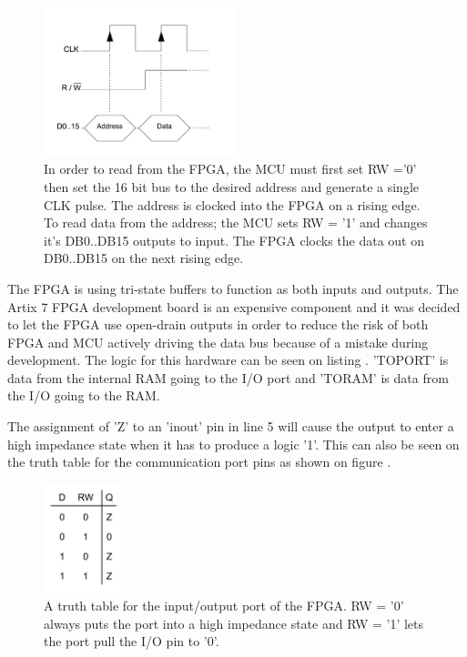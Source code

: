 \begin{figure}[H]
    \centering
    \includegraphics[clip, trim=0 50 0 0, width=0.5\textwidth]{Sections/7_SystemDesign/Figures/7_2_1_CommRead.pdf}
    \caption{In order to read from the FPGA, the MCU must first set RW ='0' then set the 16 bit bus to the desired address and generate a single CLK pulse. The address is clocked into the FPGA on a rising edge. To read data from the address; the MCU sets RW = '1' and changes it's DB0..DB15 outputs to input. The FPGA clocks the data out on DB0..DB15 on the next rising edge.}
    \label{fig_7_2_1_CommRead}
\end{figure}

The FPGA is using tri-state buffers to function as both inputs and outputs. The Artix 7 FPGA development board is an expensive component and it was decided to let the FPGA use open-drain outputs in order to reduce the risk of both FPGA and MCU actively driving the data bus because of a mistake during development. The logic for this hardware can be seen on listing . 'TOPORT' is data from the internal RAM going to the I/O port and 'TORAM' is data from the I/O going to the RAM.



The assignment of 'Z' to an 'inout' pin in line 5 will cause the output to enter a high impedance state when it has to produce a logic '1'. This can also be seen on the truth table for the communication port pins as shown on figure .

\begin{figure}[H]
    \centering
    \includegraphics[clip, trim=0 50 0 0, width=0.2\textwidth]{Sections/7_SystemDesign/Figures/7_2_1_IOPortLogic.pdf}
    \caption{A truth table for the input/output port of the FPGA. RW = '0' always puts the port into a high impedance state and RW = '1' lets the port pull the I/O pin to '0'.}
    \label{fig_7_2_1_TruthTable}
\end{figure}

